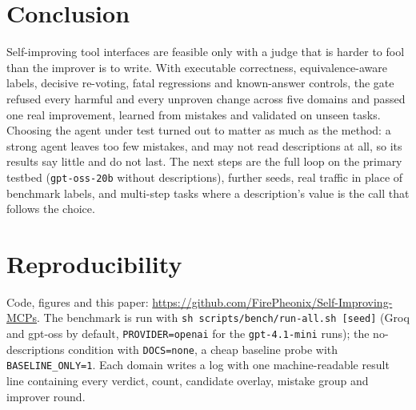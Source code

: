 \documentclass[11pt]{article}
\begin{document}
\section{Conclusion}

Self-improving tool interfaces are feasible only with a judge that is harder to fool than the improver is to write. With
executable correctness, equivalence-aware labels, decisive re-voting, fatal regressions and known-answer controls, the gate
refused every harmful and every unproven change across five domains and passed one real improvement, learned from mistakes and
validated on unseen tasks. Choosing the agent under test turned out to matter as much as the method: a strong agent leaves too
few mistakes, and may not read descriptions at all, so its results say little and do not last. The next steps are the full loop
on the primary testbed (\texttt{gpt-oss-20b} without descriptions), further seeds, real traffic in place of benchmark labels, and
multi-step tasks where a description's value is the call that follows the choice.

\appendix
\section{Reproducibility}
Code, figures and this paper: \url{https://github.com/FirePheonix/Self-Improving-MCPs}. The benchmark is run with
\texttt{sh scripts/bench/run-all.sh [seed]} (Groq and gpt-oss by default, \texttt{PROVIDER=openai} for the
\texttt{gpt-4.1-mini} runs); the no-descriptions condition with \texttt{DOCS=none}, a cheap baseline probe with
\texttt{BASELINE\_ONLY=1}. Each domain writes a log
with one machine-readable result line containing every verdict, count, candidate overlay, mistake group and improver round.



\end{document}

